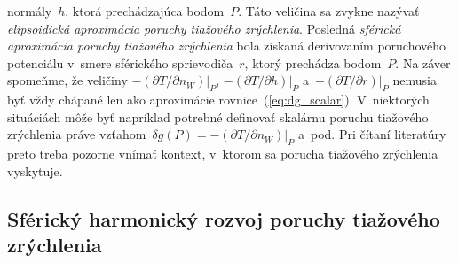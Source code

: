 \documentclass[a4paper,12pt]{book}
\begin{document}
normály~$h$, ktorá prechádzajúca bodom~$P$.  Táto veličina sa zvykne nazývať 
\emph{elipsoidická aproximácia poruchy tiažového zrýchlenia}.  Posledná 
\emph{sférická aproximácia poruchy tiažového zrýchlenia} bola získaná 
derivovaním poruchového potenciálu v~smere sférického sprievodiča~$r$, ktorý 
prechádza bodom~$P$.  Na záver spomeňme, že veličiny $-\left(\partial T \slash 
\partial n_W\right)|_P$, $-\left(\partial T \slash \partial h\right)|_P$ 
a~$-\left(\partial T \slash \partial r\right)|_P$ nemusia byť vždy chápané len 
ako aproximácie rovnice~(\ref{eq:dg_scalar}).  V~niektorých situáciách môže byť 
napríklad potrebné definovať skalárnu poruchu tiažového zrýchlenia práve 
vzťahom~$\delta g(P) = -\left(\partial T \slash \partial n_W\right)|_P$ a~pod.  
Pri čítaní literatúry preto treba pozorne vnímať kontext, v~ktorom sa porucha 
tiažového zrýchlenia vyskytuje.


\subsection{Sférický harmonický rozvoj poruchy tiažového zrýchlenia}
\end{document}
